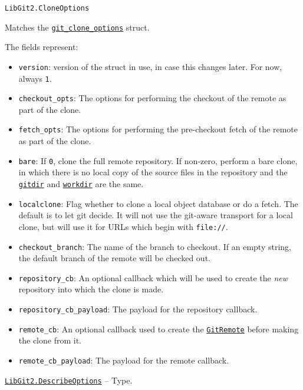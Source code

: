 \begin{adjustwidth}{2em}{0pt}


\begin{verbatim}
LibGit2.CloneOptions
\end{verbatim}

Matches the \href{https://libgit2.org/libgit2/\#HEAD/type/git\_clone\_options}{\texttt{git\_clone\_options}} struct.

The fields represent:

\begin{itemize}
\item \texttt{version}: version of the struct in use, in case this changes later. For now, always \texttt{1}.


\item \texttt{checkout\_opts}: The options for performing the checkout of the remote as part of the clone.


\item \texttt{fetch\_opts}: The options for performing the pre-checkout fetch of the remote as part of the clone.


\item \texttt{bare}: If \texttt{0}, clone the full remote repository. If non-zero, perform a bare clone, in which  there is no local copy of the source files in the repository and the \hyperlink{12125979754140967861}{\texttt{gitdir}} and \hyperlink{6689577338311178757}{\texttt{workdir}}  are the same.


\item \texttt{localclone}: Flag whether to clone a local object database or do a fetch. The default is to let git decide.  It will not use the git-aware transport for a local clone, but will use it for URLs which begin with \texttt{file://}.


\item \texttt{checkout\_branch}: The name of the branch to checkout. If an empty string, the default branch of the  remote will be checked out.


\item \texttt{repository\_cb}: An optional callback which will be used to create the \emph{new} repository into which  the clone is made.


\item \texttt{repository\_cb\_payload}: The payload for the repository callback.


\item \texttt{remote\_cb}: An optional callback used to create the \hyperlink{9925970107179782013}{\texttt{GitRemote}} before making the clone from it.


\item \texttt{remote\_cb\_payload}: The payload for the remote callback.

\end{itemize}


\end{adjustwidth}
\hypertarget{7523488922232000806}{} 
\hyperlink{7523488922232000806}{\texttt{LibGit2.DescribeOptions}}  -- {Type.}

